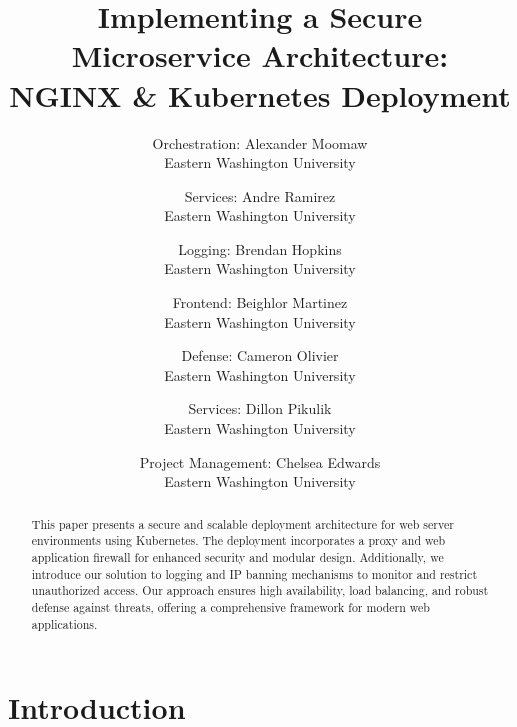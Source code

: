\documentclass[letterpaper,twocolumn,10pt]{article}
\begin{document}

\date{}

\title{\Large \bf Implementing a Secure Microservice Architecture:\\
  NGINX \& Kubernetes Deployment}

\author{
{\rm Orchestration: Alexander Moomaw}\\
Eastern Washington University
\and
{\rm Services: Andre Ramirez}\\
Eastern Washington University
\and
{\rm Logging: Brendan Hopkins}\\
Eastern Washington University
\and
{\rm Frontend: Beighlor Martinez}\\
Eastern Washington University
\and
{\rm Defense: Cameron Olivier}\\
Eastern Washington University
\and
{\rm Services: Dillon Pikulik}\\
Eastern Washington University
\and
{\rm Project Management: Chelsea Edwards}\\
Eastern Washington University
}

\maketitle
\begin{abstract}
This paper presents a secure and scalable deployment architecture for web server environments using Kubernetes. 
The deployment incorporates a proxy and web application firewall for enhanced security and modular design. 
Additionally, we introduce our solution to logging and IP banning mechanisms to monitor and restrict unauthorized access. 
Our approach ensures high availability, load balancing, and robust defense against threats, offering a comprehensive framework for modern web applications.
\end{abstract}

\section{Introduction}

\end{document}
